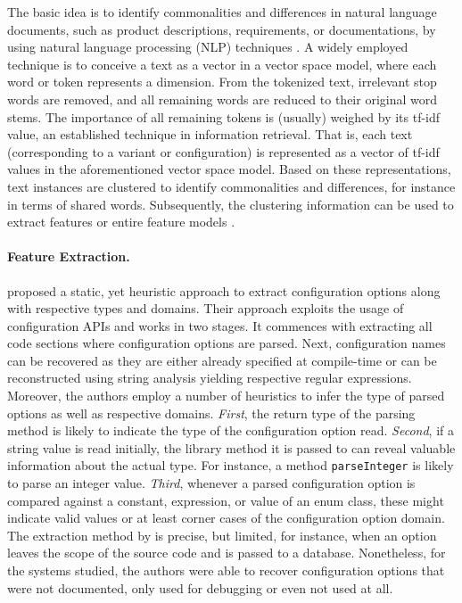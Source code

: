 The basic idea is to identify commonalities and differences in natural language
documents, such as product descriptions, requirements, or documentations, by
using natural language processing (NLP) techniques \citep{bakar_feature_2015}. A
widely employed technique is to conceive a text as a vector in a vector space model, where each word or
token represents a dimension. From the tokenized text, irrelevant stop words
are removed, and all remaining words are reduced to their original word stems.
The importance of all remaining tokens is (usually) weighed by its tf-idf
value, an established technique in information retrieval. That is, each text
(corresponding to a variant or configuration) is represented as a vector of
tf-idf values in the aforementioned vector space model. 
Based on these representations, text instances are clustered to identify
commonalities and differences, for instance in terms of shared words.
Subsequently, the clustering information can be used to extract features or entire feature
models \citep{alves_exploratory_2008,bakar_feature_2015}.

\paragraph{Feature Extraction.} \cite{rabkin_static_2011} proposed a static, yet
heuristic approach to extract configuration options along with respective types and domains. Their approach
exploits the usage of configuration APIs and works
in two stages. It commences with extracting all code sections where
configuration options are parsed. Next, configuration names can be
recovered as they are either already specified at compile-time or can be
reconstructed using string analysis yielding respective regular expressions.
Moreover, the authors employ a number of heuristics to infer the type of parsed
options as well as respective domains. \emph{First}, the return type of the
parsing method is likely to indicate the type of the configuration option read.
\emph{Second}, if a string value is read initially, the library method it is
passed to can reveal valuable information about the actual type. For instance, a method
\texttt{parseInteger} is likely to parse an integer value. \emph{Third},
whenever a parsed configuration option is compared against a constant, expression, or value
of an enum class, these might indicate valid values or at least corner cases of
the configuration option domain. The extraction method by
\cite{rabkin_static_2011} is precise, but limited, for instance, when an
option leaves the scope of the source code and is passed to a database.
Nonetheless, for the systems studied, the authors were able to recover
configuration options that were not documented, only used for debugging or even not used at
all.

